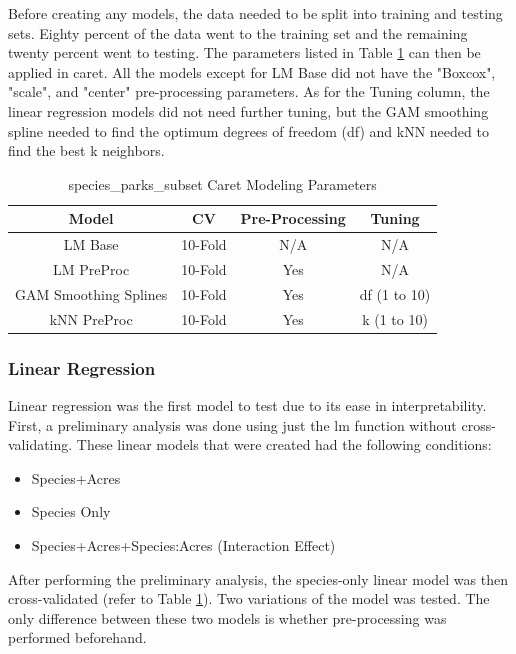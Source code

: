 \documentclass[stu, floatsintext, 11pt]{apa7}
\begin{document}
Before creating any models, the data needed to be split into training and testing sets. Eighty percent of the data went to the training set and the remaining twenty percent went to testing. The parameters listed in Table \ref{tab:subset_caret} can then be applied in caret. All the models except for LM Base did not have the "Boxcox", "scale", and "center" pre-processing parameters. As for the Tuning column, the linear regression models did not need further tuning, but the GAM smoothing spline needed to find the optimum degrees of freedom (df) and kNN needed to find the best k neighbors.

\begin{table}[h!]
    \centering
    \caption{species\_parks\_subset Caret Modeling Parameters}
    \begin{tabular}{c c c c}
    \hline
    \textbf{Model} & \textbf{CV} & \textbf{Pre-Processing}  & \textbf{Tuning} \\
    \hline
    LM Base &  10-Fold & N/A & N/A \\
    LM PreProc &  10-Fold & Yes & N/A \\
    GAM Smoothing Splines & 10-Fold & Yes & df (1 to 10) \\
    kNN PreProc & 10-Fold & Yes & k (1 to 10) \\
    \hline
    \end{tabular}
    \label{tab:subset_caret}
\end{table}

\subsubsection{Linear Regression}
Linear regression was the first model to test due to its ease in interpretability. First, a preliminary analysis was done using just the lm function without cross-validating. These linear models that were created had the following conditions:
\begin{itemize}
    \item Species+Acres
    \item Species Only
    \item Species+Acres+Species:Acres (Interaction Effect)
\end{itemize}

After performing the preliminary analysis, the species-only linear model was then cross-validated (refer to Table \ref{tab:subset_caret}). Two variations of the model was tested. The only difference between these two models is whether pre-processing was performed beforehand.
\end{document}
